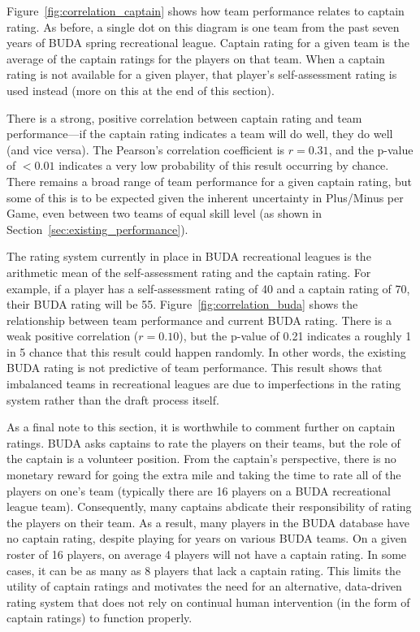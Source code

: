 Figure~\ref{fig:correlation_captain} shows how team performance relates to captain rating.  As before, a single dot on this diagram is one team from the past seven years of BUDA spring recreational league.  Captain rating for a given team is the average of the captain ratings for the players on that team. When a captain rating is not available for a given player, that player's self-assessment rating is used instead (more on this at the end of this section).

There is a strong, positive correlation between captain rating and team performance---if the captain rating indicates a team will do well, they do well (and vice versa). The Pearson's correlation coefficient is $r = 0.31$, and the p-value of $<0.01$ indicates a very low probability of this result occurring by chance. There remains a broad range of team performance for a given captain rating, but some of this is to be expected given the inherent uncertainty in Plus/Minus per Game, even between two teams of equal skill level (as shown in Section~\ref{sec:existing_performance}).

The rating system currently in place in BUDA recreational leagues is the arithmetic mean of the self-assessment rating and the captain rating.  For example, if a player has a self-assessment rating of 40 and a captain rating of 70, their BUDA rating will be 55. Figure~\ref{fig:correlation_buda} shows the relationship between team performance and current BUDA rating. There is a weak positive correlation ($r = 0.10$), but the p-value of 0.21 indicates a roughly 1 in 5 chance that this result could happen randomly.  In other words, the existing BUDA rating is not predictive of team performance. This result shows that imbalanced teams in recreational leagues are due to imperfections in the rating system rather than the draft process itself.

As a final note to this section, it is worthwhile to comment further on captain ratings. BUDA asks captains to rate the players on their teams, but the role of the captain is a volunteer position. From the captain's perspective, there is no monetary reward for going the extra mile and taking the time to rate all of the players on one's team (typically there are 16 players on a BUDA recreational league team). Consequently, many captains abdicate their responsibility of rating the players on their team. As a result, many players in the BUDA database have no captain rating, despite playing for years on various BUDA teams. On a given roster of 16 players, on average 4 players will not have a captain rating.  In some cases, it can be as many as 8 players that lack a captain rating. This limits the utility of captain ratings and motivates the need for an alternative, data-driven rating system that does not rely on continual human intervention (in the form of captain ratings) to function properly.
